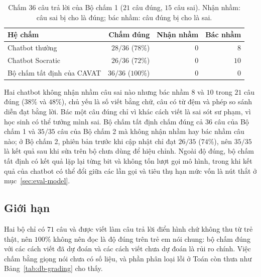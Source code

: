 \begin{table}[H]
\centering
\caption{Chấm $36$ câu trả lời của Bộ chấm 1 ($21$ câu đúng, $15$ câu sai). Nhận nhầm: câu sai bị cho là đúng; bác nhầm: câu đúng bị cho là sai.}\label{tab:golden-grading}
\small
\begin{tabular}{lrrr}
\toprule
Hệ chấm & Chấm đúng & Nhận nhầm & Bác nhầm \\
\midrule
Chatbot thường & $28/36$ ($78\%$) & $0$ & $8$ \\
Chatbot Socratic & $26/36$ ($72\%$) & $0$ & $10$ \\
Bộ chấm tất định của CAVAT & $36/36$ ($100\%$) & $0$ & $0$ \\
\bottomrule
\end{tabular}
\end{table}

Hai chatbot không nhận nhầm câu sai nào nhưng bác nhầm $8$ và $10$ trong $21$ câu đúng ($38\%$ và $48\%$), chủ yếu là số viết bằng chữ, câu có từ đệm và phép so sánh diễn đạt bằng lời. Bác một câu đúng chỉ vì khác cách viết là sai sót sư phạm, vì học sinh có thể tưởng mình sai. Bộ chấm tất định chấm đúng cả $36$ câu của Bộ chấm 1 và $35/35$ câu của Bộ chấm 2 mà không nhận nhầm hay bác nhầm câu nào; ở Bộ chấm 2, phiên bản trước khi cập nhật chỉ đạt $26/35$ ($74\%$), nên $35/35$ là kết quả sau khi sửa trên bộ chưa dùng để hiệu chỉnh. Ngoài độ đúng, bộ chấm tất định có kết quả lặp lại từng bit và không tốn lượt gọi mô hình, trong khi kết quả của chatbot có thể đổi giữa các lần gọi và tiêu thụ hạn mức vốn là nút thắt ở mục~\ref{sec:eval-model}.

\subsection{Giới hạn}
Hai bộ chỉ có $71$ câu và được viết làm câu trả lời điển hình chứ không thu từ trẻ thật, nên $100\%$ không nên đọc là độ đúng trên trẻ em nói chung: bộ chấm đúng với các cách viết đã dự đoán và các cách viết chưa dự đoán là rủi ro chính. Việc chấm bằng giọng nói chưa có số liệu, và phần phân loại lỗi ở Toán còn thưa như Bảng~\ref{tab:db-grading} cho thấy.
